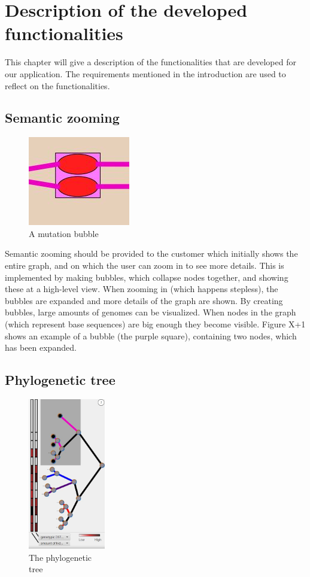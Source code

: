 
\chapter{Description of the developed functionalities}
This chapter will give a description of the functionalities that are developed for our application. The requirements mentioned in the introduction are used to reflect on the functionalities.
\section{Semantic zooming}
\begin{figure}
	\centering
	\includegraphics{images/mutation.jpg}
	\caption{\label{fig:bubble}A mutation bubble}
\end{figure}
Semantic zooming should be provided to the customer which initially shows the entire graph, and on which the user can zoom in to see more details. This is implemented by making bubbles, which collapse nodes together, and showing these at a high-level view. When zooming in (which happens stepless), the bubbles are expanded and more details of the graph are shown. By creating bubbles, large amounts of genomes can be visualized. When nodes in the graph (which represent base sequences) are big enough they become visible. Figure X+1 shows an example of a bubble (the purple square), containing two nodes, which has been expanded. 

\section{Phylogenetic tree}

\begin{figure}
	\centering
	\includegraphics[width=0.3\textwidth]{images/tree.jpg}
	\caption{\label{fig:tree}The phylogenetic\\tree}
\end{figure}

